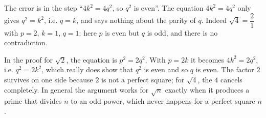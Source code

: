 The error is in the step ``$4k^2=4q^2$, so $q^2$ is even''. The equation $4k^2=4q^2$ only gives $q^2=k^2$, i.e. $q=k$, and says nothing about the parity of $q$. Indeed $\sqrt4=\dfrac{2}{1}$ with $p=2$, $k=1$, $q=1$: here $p$ is even but $q$ is odd, and there is no contradiction.

In the proof for $\sqrt2$, the equation is $p^2=2q^2$. With $p=2k$ it becomes $4k^2=2q^2$, i.e. $q^2=2k^2$, which really does show that $q^2$ is even and so $q$ is even. The factor $2$ survives on one side because $2$ is not a perfect square; for $\sqrt4$, the $4$ cancels completely. In general the argument works for $\sqrt n$ exactly when it produces a prime that divides $n$ to an odd power, which never happens for a perfect square $n$.
